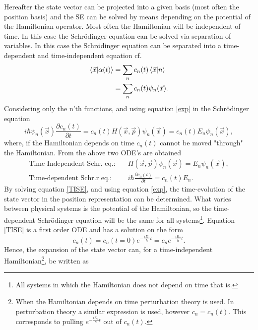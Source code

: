 Hereafter the state vector can be projected into a given basis (most often the position basis) and the SE can be solved by means depending on the potential of the Hamiltonian operator. Most often the Hamiltonian will be independent of time. In this case the Schrödinger equation can be solved via separation of variables. In this case the Schrödinger equation can be separated into a time-dependent and time-independent equation cf.
\begin{equation}
	\begin{split}
		\braket{\vec{x}|\alpha(t)}&=\sum_nc_n(t)\braket{\vec{x}|n}\\
		&=\sum_nc_n(t)\psi_n(\vec{x}).\\
	\end{split}
	\label{exp}
\end{equation} 
Considering only the n'th functions, and using equation \eqref{exp} in the Schrödinger equation
\begin{equation}
	i\hbar \psi_n(\vec{x})\frac{\partial c_n(t)}{\partial t}=c_n(t)H(\vec{x},\vec{p})\psi_n(\vec{x})=c_n(t)E_n\psi_n(\vec{x}),
\end{equation} 
where, if the Hamiltonian depends on time $c_n(t)$ cannot be moved "through" the Hamiltonian. From the above two ODE's are obtained
\begin{equation}
	\begin{split}
		\text{Time-Independent Schr. eq.:} \quad &H(\vec{x},\vec{p})\psi_n(\vec{x})=E_n\psi_n(\vec{x}),\\
		\text{Time-dependent Schr.r eq.:} \quad &i\hbar \frac{\partial c_n(t)}{\partial t}=c_n(t)E_n.
	\end{split}
	\label{TISE}
\end{equation}  
By solving equation \eqref{TISE}, and using equation \eqref{exp}, the time-evolution of the state vector in the position representation can be determined. What varies between physical systems is the potential of the Hamiltonian, so the time-dependent Schrödinger equation will be the same for all systems\footnote{All systems in which the Hamiltonian does not depend on time that is.}. Equation \eqref{TISE} is a first order ODE and has a solution on the form
\begin{equation}
	c_n(t)=c_n(t=0)e^{-\frac{iE_n}{\hbar}t}=c_ne^{-\frac{iE_n}{\hbar}t}.
\end{equation} 
Hence, the expansion of the state vector can, for a time-independent Hamiltonian\footnote{When the Hamiltonian depends on time perturbation theory is used. In perturbation theory a similar expression is used, however $c_n=c_n(t)$. This corresponds to pulling $e^{-\frac{iE_n}{\hbar}t}$ out of $c_n(t)$.}, be written as
